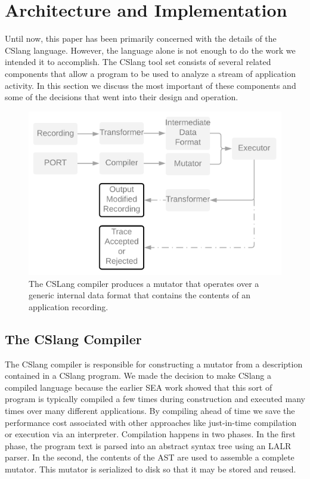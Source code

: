 \section{Architecture and Implementation}

Until now, this paper has been primarily concerned with the details of the
CSlang language.  However, the language alone is not enough to do the work
we intended it to accomplish.  The CSlang tool set
consists of several related
components that allow a program to be used to analyze a stream of
application activity.
In this section we discuss the most important of these components and some
of the decisions that went into their design and operation.

\label{SEC:architecture}

\begin{figure}
  \includegraphics[scale=.08]{images/architecture}
  \caption{The CSLang compiler produces a mutator that operates over a
  generic internal data format that contains the contents of an application
  recording.}
  \label{fig:architecture}
\end{figure}

\subsection{The CSlang Compiler}

The CSlang compiler is responsible for constructing a mutator
from a description contained in  a CSlang program.
We made the decision to make CSlang a compiled language because
the earlier SEA work showed that this sort of program is typically
compiled a few times during construction
and executed many times over many different applications.
By compiling ahead of time we save the performance cost associated with other
approaches like just-in-time compilation or execution via an interpreter.
Compilation happens in two phases.  In the first phase, the program text is
parsed into an abstract syntax tree using an LALR parser.
In the second, the
contents of the AST are used to assemble a complete mutator.
This mutator is serialized to
disk so that it may be stored and reused.


